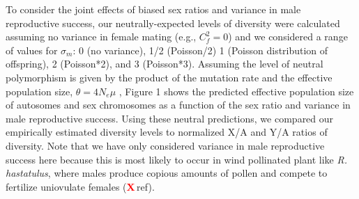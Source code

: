 \documentclass[9pt,twocolumn,twoside]{gsajnl}
\newcommand{\X}{\textcolor{red}{\bf X\,}}
\begin{document}
To consider the joint effects of biased sex ratios and variance in male reproductive success, our neutrally-expected levels of diversity were calculated assuming no variance in female mating (e.g., $C^2_{f}=0$) and we considered a range of values for $\sigma_{m}$: 0 (no variance), 1/2 (Poisson/2) 1 (Poisson distribution of offspring), 2 (Poisson*2), and 3 (Poisson*3). Assuming the level of neutral polymorphism is given by the product of the mutation rate and the effective population size, $\theta=4N_{e}\mu$ \citep{watterson1975,kimura1984}, Figure 1 shows the predicted effective population size of autosomes and sex chromosomes as a function of the sex ratio and variance in male reproductive success. Using these neutral predictions, we compared our empirically estimated diversity levels to normalized X/A and Y/A ratios of diversity. Note that we have only considered variance in male reproductive success here because this is most likely to occur in wind pollinated plant like \textit{R. hastatulus}, where males produce copious amounts of pollen and compete to fertilize uniovulate females (\X ref).










\end{document}
